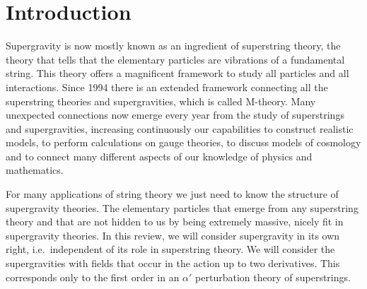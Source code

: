 \documentclass[a4paper,11pt,twoside]{article}
\begin{document}
\begin{abstract}
\parindent0pt\noindent
We give an elementary introduction to the structure of supergravity
theories. This leads to a table with an overview of supergravity and
supersymmetry theories in dimensions 4 to 11. The basic steps in
constructing supergravity theories are considered: determination of the
underlying algebra, the multiplets, the actions, and solutions. Finally,
an overview is given of the geometries that result from the scalars of
supergravity theories.

\bigskip
\it Key words: Supergravity, gauge theories, superalgebras, K{\"a}hler
geometry, quaternionic geometry

MSC 2000: 83E50, 53C26, 32M10, 51P05, 17B81

\end{abstract}


%
%
\tableofcontents
\section{Introduction}

Supergravity is now mostly known as an ingredient of superstring theory,
the theory that tells that the elementary particles are vibrations of a
fundamental string. This theory offers a magnificent framework to study
all particles and all interactions. Since 1994 there is an extended
framework connecting all the superstring theories and supergravities,
which is called M-theory. Many unexpected connections now emerge every
year from the study of superstrings and supergravities, increasing
continuously our capabilities to construct realistic models, to perform
calculations on gauge theories, to discuss models of cosmology and to
connect many different aspects of our knowledge of physics and
mathematics.

For many applications of string theory we just need to know the structure
of supergravity theories. The elementary particles that emerge from any
superstring theory and that are not hidden to us by being extremely
massive, nicely fit in supergravity theories. In this review, we will
consider supergravity in its own right, i.e.\ independent of its role in
superstring theory. We will consider the supergravities with fields that
occur in the action up to two derivatives. This corresponds only to the
first order in an $\alpha '$ perturbation theory of superstrings.
\end{document}
